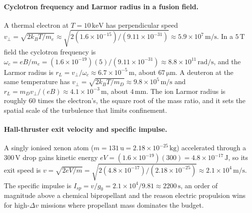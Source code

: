 \paragraph{Cyclotron frequency and Larmor radius in a fusion field.}
A thermal electron at $T = 10\,\si{\kilo\electronvolt}$ has perpendicular
speed $v_{\perp} = \sqrt{2k_{B}T/m_{e}} \approx \sqrt{2(1.6\times
10^{-15})/(9.11\times 10^{-31})} \approx 5.9\times 10^{7}\,\si{\meter\per
\second}$. In a $5\,\si{\tesla}$ field the cyclotron frequency is
$\omega_{c} = eB/m_{e} = (1.6\times 10^{-19})(5)/(9.11\times 10^{-31})
\approx 8.8\times 10^{11}\,\si{\radian\per\second}$, and the Larmor radius
is $r_{L} = v_{\perp}/\omega_{c} \approx 6.7\times 10^{-5}\,\si{\meter}$,
about $67\,\si{\micro\meter}$. A deuteron at the same temperature has
$v_{\perp} = \sqrt{2k_{B}T/m_{D}} \approx 9.8\times 10^{5}\,\si{\meter\per
\second}$ and $r_{L} = m_{D}v_{\perp}/(eB) \approx 4.1\times
10^{-3}\,\si{\meter}$, about $4\,\si{\milli\meter}$. The ion Larmor radius
is roughly $60$ times the electron's, the square root of the mass ratio,
and it sets the spatial scale of the turbulence that limits confinement.

\paragraph{Hall-thruster exit velocity and specific impulse.}
A singly ionised xenon atom ($m = 131\,\text{u} = 2.18\times
10^{-25}\,\si{\kilogram}$) accelerated through a $300\,\si{\volt}$ drop
gains kinetic energy $eV = (1.6\times 10^{-19})(300) = 4.8\times
10^{-17}\,\si{\joule}$, so its exit speed is $v = \sqrt{2eV/m} =
\sqrt{2(4.8\times 10^{-17})/(2.18\times 10^{-25})} \approx 2.1\times
10^{4}\,\si{\meter\per\second}$. The specific impulse is $I_{sp} =
v/g_{0} = 2.1\times 10^{4}/9.81 \approx 2200\,\si{\second}$, an order of
magnitude above a chemical bipropellant and the reason electric
propulsion wins for high-$\Delta v$ missions where propellant mass
dominates the budget.

